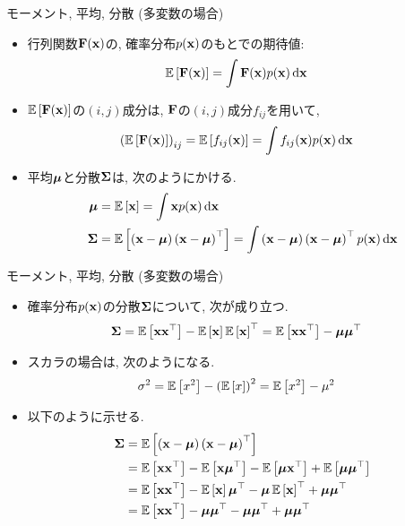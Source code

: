 \documentclass[dvipdfmx,notheorems,t]{beamer}
\begin{document}
\begin{frame}{モーメント, 平均, 分散 (多変数の場合)}
\begin{itemize}
  \item 行列関数$\vb{F}(\vb{x})$の, 確率分布$p(\vb{x})$のもとでの期待値:
  \begin{align*}
    \operatorname{\mathbb{E}} \left[ \vb{F}(\vb{x}) \right] &= \int \vb{F}(\vb{x}) p(\vb{x}) \dd{\vb{x}}
  \end{align*}
  \item $\operatorname{\mathbb{E}} \left[ \vb{F}(\vb{x}) \right]$の$(i, j)$成分は, $\vb{F}$の$(i, j)$成分$f_{ij}$を用いて,
  \begin{align*}
    \left( \operatorname{\mathbb{E}} \left[ \vb{F}(\vb{x}) \right] \right)_{ij} &= \operatorname{\mathbb{E}} \left[ f_{ij}(\vb{x}) \right]
      = \int f_{ij}(\vb{x}) p(\vb{x}) \dd{\vb{x}}
  \end{align*}
  \item 平均$\vb*{\mu}$と分散$\vb{\Sigma}$は, 次のようにかける.
  \begin{align*}
    \vb*{\mu} &= \operatorname{\mathbb{E}} \left[ \vb{x} \right] = \int \vb{x} p(\vb{x}) \dd{\vb{x}} \\
    \vb{\Sigma} &= \operatorname{\mathbb{E}} \left[ \left( \vb{x} - \vb*{\mu} \right) \left( \vb{x} - \vb*{\mu} \right)^\top \right]
      = \int \left( \vb{x} - \vb*{\mu} \right) \left( \vb{x} - \vb*{\mu} \right)^\top p(\vb{x}) \dd{\vb{x}}
  \end{align*}
\end{itemize}
\end{frame}

\begin{frame}{モーメント, 平均, 分散 (多変数の場合)}
\begin{itemize}
  \item 確率分布$p(\vb{x})$の分散$\vb{\Sigma}$について, 次が成り立つ.
  \begin{align*}
    \vb{\Sigma} &= \operatorname{\mathbb{E}} \left[ \vb{x} \vb{x}^\top \right] - \operatorname{\mathbb{E}} \left[ \vb{x} \right] \operatorname{\mathbb{E}} \left[ \vb{x} \right]^\top
      = \operatorname{\mathbb{E}} \left[ \vb{x} \vb{x}^\top \right] - \vb*{\mu} \vb*{\mu}^\top
  \end{align*}
  \item スカラの場合は, 次のようになる.
  \begin{align*}
    \sigma^2 &= \operatorname{\mathbb{E}} \left[ x^2 \right] - \left( \operatorname{\mathbb{E}} \left[ x \right] \right)^2 = \operatorname{\mathbb{E}} \left[ x^2 \right] - \mu^2
  \end{align*}
  \item 以下のように示せる.
  \begin{align*}
    \vb{\Sigma} &= \operatorname{\mathbb{E}} \left[ \left( \vb{x} - \vb*{\mu} \right) \left( \vb{x} - \vb*{\mu} \right)^\top \right] \\
      &= \operatorname{\mathbb{E}} \left[ \vb{x} \vb{x}^\top \right] - \operatorname{\mathbb{E}} \left[ \vb{x} \vb*{\mu}^\top \right]
        - \operatorname{\mathbb{E}} \left[ \vb*{\mu} \vb{x}^\top \right] + \operatorname{\mathbb{E}} \left[ \vb*{\mu} \vb*{\mu}^\top \right] \\
      &= \operatorname{\mathbb{E}} \left[ \vb{x} \vb{x}^\top \right] - \operatorname{\mathbb{E}} \left[ \vb{x} \right] \vb*{\mu}^\top
        - \vb*{\mu} \operatorname{\mathbb{E}} \left[ \vb{x} \right]^\top + \vb*{\mu} \vb*{\mu}^\top \\
      &= \operatorname{\mathbb{E}} \left[ \vb{x} \vb{x}^\top \right] - \vb*{\mu} \vb*{\mu}^\top
        - \vb*{\mu} \vb*{\mu}^\top + \vb*{\mu} \vb*{\mu}^\top
  \end{align*}
\end{itemize}
\end{frame}
\end{document}
